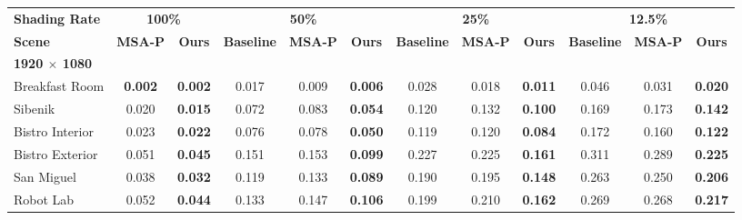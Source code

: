 \begin{table*}[t]
\scriptsize
\setlength{\tabcolsep}{3pt}
\centering
\begin{tabular}{l cc | ccc | ccc | ccc}
\textbf{Shading Rate}         & \multicolumn{2}{c|}{\textbf{100\%}} & \multicolumn{3}{c|}{\textbf{50\%}}  & \multicolumn{3}{c|}{\textbf{25\%}}  & \multicolumn{3}{c}{\textbf{12.5\%}}  \\
\textbf{Scene}                & \textbf{MSA-P} & \textbf{Ours}           & \textbf{Baseline} & \textbf{MSA-P} & \textbf{Ours}           & \textbf{Baseline} & \textbf{MSA-P} & \textbf{Ours}           & \textbf{Baseline} & \textbf{MSA-P} & \textbf{Ours}           \\
\hline
\textbf{1920 $\times$ 1080}   & & & & & & & & & & & \\
Breakfast Room                & \textbf{0.002} & \textbf{0.002}          & 0.017             & 0.009          & \textbf{0.006}          & 0.028             & 0.018          & \textbf{0.011}          & 0.046             & 0.031          & \textbf{0.020}          \\
Sibenik                       & 0.020          & \textbf{0.015}          & 0.072             & 0.083          & \textbf{0.054}          & 0.120             & 0.132          & \textbf{0.100}          & 0.169             & 0.173          & \textbf{0.142}          \\
Bistro Interior               & 0.023          & \textbf{0.022}          & 0.076             & 0.078          & \textbf{0.050}          & 0.119             & 0.120          & \textbf{0.084}          & 0.172             & 0.160          & \textbf{0.122}          \\
Bistro Exterior               & 0.051          & \textbf{0.045}          & 0.151             & 0.153          & \textbf{0.099}          & 0.227             & 0.225          & \textbf{0.161}          & 0.311             & 0.289          & \textbf{0.225}          \\
San Miguel                    & 0.038          & \textbf{0.032}          & 0.119             & 0.133          & \textbf{0.089}          & 0.190             & 0.195          & \textbf{0.148}          & 0.263             & 0.250          & \textbf{0.206}          \\
Robot Lab                     & 0.052          & \textbf{0.044}          & 0.133             & 0.147          & \textbf{0.106}          & 0.199             & 0.210          & \textbf{0.162}          & 0.269             & 0.268          & \textbf{0.217}          \\

\end{tabular}
\end{table*}
